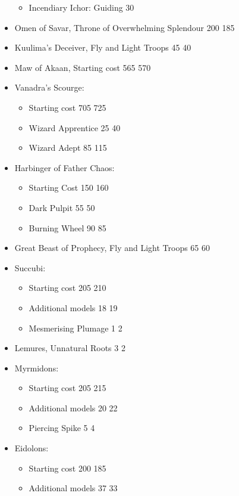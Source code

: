 \begin{itemize}
\begin{itemize}
\item Incendiary Ichor: Guiding 30
\end{itemize}
\item Omen of Savar, Throne of Overwhelming Splendour 200 \costdown{} 185
\item Kuulima's Deceiver, Fly and Light Troops 45 \costdown{} 40
\item Maw of Akaan, Starting cost 565 \costup{} 570
\item Vanadra's Scourge:
\begin{itemize}
\item Starting cost 705 \costup{} 725
\item Wizard Apprentice 25 \costup{} 40
\item Wizard Adept 85 \costup{} 115
\end{itemize}
\item Harbinger of Father Chaos:
\begin{itemize}
\item Starting Cost 150 \costup{} 160
\item Dark Pulpit 55 \costdown{} 50
\item Burning Wheel 90 \costdown{} 85
\end{itemize}
\item Great Beast of Prophecy, Fly and Light Troops 65 \costdown{} 60
\item Succubi:
\begin{itemize}
\item Starting cost 205 \costup{} 210
\item Additional models 18\permodel{} \costup{} 19\permodel{}
\item Mesmerising Plumage 1\permodel{} \costup{} 2\permodel{}
\end{itemize}
\item Lemures, Unnatural Roots 3 \costdown{} 2
\item Myrmidons:
\begin{itemize}
\item Starting cost 205 \costup{} 215
\item Additional models 20\permodel{} \costup{} 22\permodel{}
\item Piercing Spike 5\permodel{} \costdown{} 4\permodel{}
\end{itemize}
\item Eidolons:
\begin{itemize}
\item Starting cost 200 \costdown{} 185
\item Additional models 37\permodel{} \costdown{} 33\permodel{}

\end{itemize}
\end{itemize}
